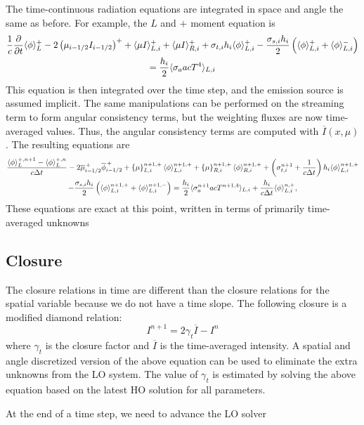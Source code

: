 The time-continuous radiation equations are integrated in space and angle the same as
before.  For example, the $L$ and $+$ moment equation is
\begin{multline}
    \frac{1}{c}   \frac{\partial  }{\partial t} \langle \phi \rangle^+_L - 2\left({\mu}_{i-1/2} I_{i-1/2}\right)^+ + \langle \mu I \rangle^+_{L,i} 
    + \langle \mu I \rangle^+_{R,i} +  \sigma_{t,i} h_i \langle \phi \rangle_{L,i}^{+} -  \frac{\sigma_{s,i} h_i}{2} \left( \langle \phi \rangle_{L,i}^{+} +
  \langle \phi \rangle_{L,i}^{-}\right) \\ = \frac{h_i}{2} \langle \sigma_a a c T^4 \rangle_{L,i} 
\end{multline}
This equation is then integrated over the time step, and the emission source is assumed
implicit.  The same manipulations can be
performed on the streaming term to form angular consistency terms, but the weighting fluxes are now
time-averaged values.  Thus, the angular consistency terms are computed with $\overline I(x,\mu)$.  
The resulting equations are
\begin{multline}
    \frac{\langle \phi \rangle_L^{+,n+1} - \langle \phi \rangle_L^{+,n}}{c \Delta t}
    -2\overline {\mu}_{i-1/2}^{\,+} \overline \phi_{i-1/2}^{\,+} + \left\{ \mu \right\}_{L,i}^{n+1,+}
  \langle \phi \rangle_{L,i}^{n+1,+}
  +  \left\{ \mu \right\}_{R,i}^{n+1,+}
  \langle \phi \rangle_{R,i}^{n+1,+} +  \left(\sigma_{t,i}^{n+1}+\frac{1}{c \Delta t} \right) h_i 
  \langle \phi \rangle_{L,i}^{n+1,+} \\-  \frac{\sigma_{s,i} h_i}{2} \left( \langle \phi \rangle_{L,i}^{n+1,+} +
  \langle \phi \rangle_{L,i}^{n+1,-}\right) = \frac{h_i}{2} \langle \sigma_a^{n+1} a c T^{n+1,4} \rangle_{L,i} +
  \frac{h_i}{c\Delta t}\langle \phi \rangle_{L,i}^{n,+},
\end{multline}
These equations are exact at this point, written in terms of primarily time-averaged unknowns

\subsection{Closure}
%

The closure relations in time are different than the closure relations for the spatial
variable because we do not have a time slope.  The following closure is a modified diamond
relation:
\begin{equation}
    I^{n+1} = 2\gamma_t \overline{I} - I^{n}
\end{equation}
where $\gamma_t$ is the closure factor and $\overline{I}$ is the time-averaged
intensity.  A spatial and angle discretized version of the above equation can be used to
eliminate the extra unknowns from the LO system.  The value of $\gamma_t$ is
estimated by solving the above equation based on the latest HO solution for all
parameters. 

At the end of a time step, we need to advance the LO solver 

